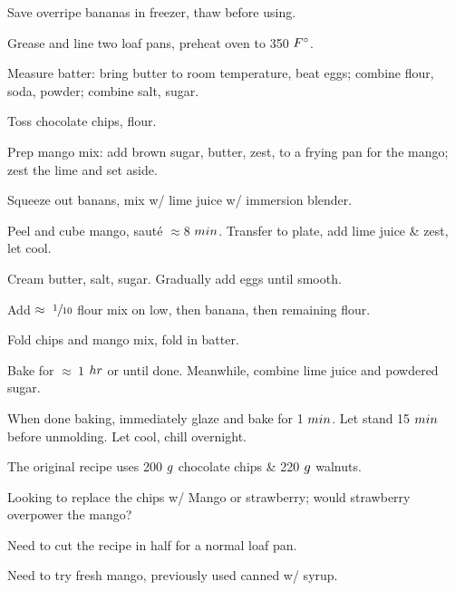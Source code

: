 \begin{preparation}
\item Save overripe bananas in freezer, thaw before using.

\item Grease and line two loaf pans, preheat oven to 350 $\Fahrenheit$.

\item Measure batter: bring butter to room temperature, beat eggs; combine flour, soda, powder; combine salt, sugar.

\item Toss chocolate chips, flour.

\item Prep mango mix: add brown sugar, butter, zest, to a frying pan for the mango;
	zest the lime and set aside.

\item Squeeze out banans, mix w/ lime juice w/ immersion blender.

\item Peel and cube mango, saut\'{e} $\approx 8$ $\minute$.
	Transfer to plate, add lime juice \& zest, let cool.

\item Cream butter, salt, sugar.
	Gradually add eggs until smooth.

\item Add $\approx~\onetenth$ flour mix on low, then banana, then remaining flour.

\item Fold chips and mango mix, fold in batter.

\item Bake for $\approx~1$ $\hour$ or until done.
	Meanwhile, combine lime juice and powdered sugar.

\item When done baking, immediately glaze and bake for 1 $\minute$.
	Let stand 15 $\minute$ before unmolding.
	Let cool, chill overnight.
\end{preparation}

\begin{variation}
\item The original recipe uses 200 $\gram$ chocolate chips \& 220 $\gram$ walnuts.
\end{variation}


\begin{experiments}
\item Looking to replace the chips w/ Mango or strawberry; would strawberry overpower the mango?
\item Need to cut the recipe in half for a normal loaf pan.
\item Need to try fresh mango, previously used canned w/ syrup.
\end{experiments}


\recipeend%

